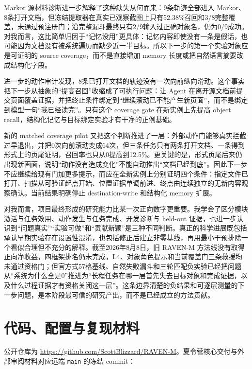 \documentclass[12pt,a4paper]{ctexart}
\begin{document}
Markor 源材料诊断进一步解释了这种缺失从何而来：9条轨迹全部进入 Markor、8条打开文档，但冻结提取器在真实已观察截图上只有52.38\%召回和3/8完整覆盖，未通过预注册门；沿完整漏斗最终只有2/9输入过正确对象名，仍为0/9成功。对我而言，这比简单归因于“记忆没用”更具体：记忆内容即使没有一条是假话，也可能因为文档没有被系统遍历而缺少近一半目标。所以下一步的第一个实验对象应是可证明的 source coverage，而不是直接增加 memory 长度或把自然语言摘要改成结构化字段。

进一步的动作审计发现，8条已打开文档的轨迹没有一次向前纵向滑动。这个事实把下一步从抽象的“提高召回”收缩成了可执行问题：让 Agent 在离开源文档前提交页面覆盖证据，并把终止条件绑定到“继续滚动已不能产生新页面”，而不是绑定到模型一句“我已经读完”。只有这个 coverage gate 在新实例上先提高 object recall，结构化记忆与目标绑定实验才有干净的正例基础。

新的 matched coverage pilot 又把这个判断推进了一层：外部动作门能够真实拦截过早退出，并把0次向前滚动变成64次，但三条任务只有两条打开文档、一条得到形式上的页尾证明，召回率也只从0提高到12.5\%。更关键的是，形式页尾后来仍出现新画面，说明“动作没有造成变化”不能自动推出“文档已经到底”。因此下一步不应继续给现有门加更多提示，而应在全新实例上分别证明四个条件：指定文件已打开、扫描从可验证起点开始、位置证据单调前进、终点由连续独立的无新内容观察确认。当前结果明确停止 destination-write 和结构化 memory 扩展。

对我而言，项目最终形成的研究能力比某一次正向数字更重要。我学会了区分模块激活与任务效用、动作发生与任务完成、开发诊断与 held-out 证据，也进一步认识到“问题真实”“实验可做”和“贡献新颖”是三种不同判断。真正的科学进展既包括承认早期实验存在设置性混淆，也包括修正后建立非零基线，再用最小干预排除一个看似合理但不充分的解释。截至2026年8月8日，旧 RAVEN-M 方法线没有取得正向净收益，四框架排名仍未完成，L4、对象角色提示和当前覆盖门三条救援均未通过资格门；但官方式57格基线、自然失败漏斗和三轮匹配负实验已经把问题从“系统为什么全是0”推进为“长程任务在哪一层首先失去目标对象和完成证据，以及什么过程证据才有资格关闭这一层”。这条边界清楚的负结果和可逐层测量的下一步问题，是本阶段最可信的研究产出，而不是已经成立的方法贡献。

\appendix

\section{代码、配置与复现材料}

公开仓库为 \url{https://github.com/ScottBlizzard/RAVEN-M}。夏令营核心交付与外部审阅材料对应远端 \texttt{main} 的冻结 commit：

\begin{center}
\end{center}
\end{document}
